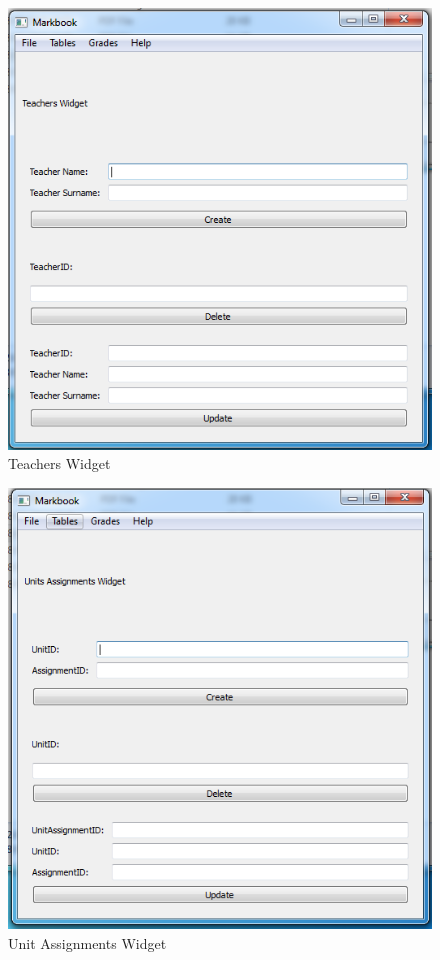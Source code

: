 \begin{figure}[H]
    \includegraphics[width=\textwidth]{./Images/teachers.png}
    \caption{Teachers Widget} \label{}
\end{figure}

\begin{figure}[H]
    \includegraphics[width=\textwidth]{./Images/unit assignments.png}
    \caption{Unit Assignments Widget} \label{}
\end{figure}

